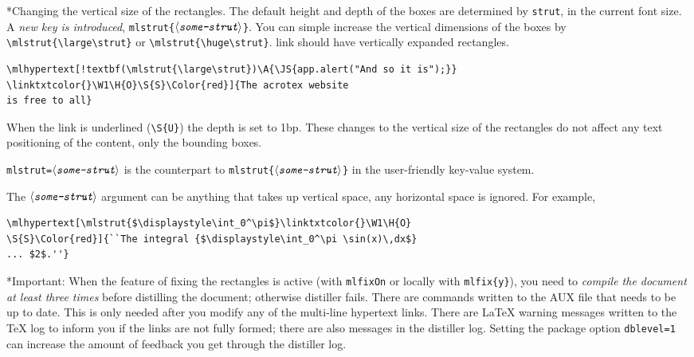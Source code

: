 \documentclass{article}
\makeatletter
\def\amtIndent{15pt}
\def\anglemeta#1{$\langle\textit{\texttt{#1}}\rangle$}
\let\ameta\anglemeta
\def\darg#1{\texttt{\{#1\}}}
\def\cs#1{\texttt{\@backslashchar#1}}
\renewcommand{\paragraph}
    {\@startsection{paragraph}{4}{0pt}{6pt}{-3pt}{\bfseries}}
\makeatother
\begin{document}
\paragraph*{Changing the vertical size of the rectangles.} The default height
and depth of the boxes are determined by \cs{strut}, in the current font
size. A \emph{new key is introduced}, \cs{mlstrut\darg{\ameta{some-strut}}}.
You can simple increase the vertical dimensions of the boxes by
\verb~\mlstrut{\large\strut}~ or \verb~\mlstrut{\huge\strut}~.
 link should have vertically expanded rectangles.
\begin{Verbatim}[xleftmargin=\amtIndent,fontsize=\small,commandchars=!()]
\mlhypertext[!textbf(\mlstrut{\large\strut})\A{\JS{app.alert("And so it is");}}
\linktxtcolor{}\W1\H{O}\S{S}\Color{red}]{The acrotex website
is free to all}
\end{Verbatim}
When the link is underlined (\verb~\S{U}~) the depth is set to 1bp. These
changes to the vertical size of the rectangles do not affect any text
positioning of the content, only the bounding boxes.

\texttt{mlstrut=\ameta{some-strut}} is the counterpart to
 \cs{mlstrut\darg{\ameta{some-strut}}} in the user-friendly key-value system.

The \ameta{some-strut} argument can be anything that takes up vertical space, any horizontal space is ignored.
For example, 
\begin{Verbatim}[xleftmargin=\amtIndent,fontsize=\small,commandchars=!()]
\mlhypertext[\mlstrut{$\displaystyle\int_0^\pi$}\linktxtcolor{}\W1\H{O}
\S{S}\Color{red}]{``The integral {$\displaystyle\int_0^\pi \sin(x)\,dx$}
... $2$.''}
\end{Verbatim}

\paragraph*{Important:} When the feature of fixing the
rectangles is active (with \cs{mlfixOn} or locally with \cs{mlfix\darg{y}}),
you need to \emph{compile the document at least three times} before
distilling the document; otherwise distiller fails. There are commands
written to the \textsf{AUX} file that needs to be up to date. This is only
needed after you modify any of the multi-line hypertext links. There are
{\LaTeX} warning messages written to the {\TeX} log to inform you if the
links are not fully formed; there are also messages in the distiller log.
Setting the package option \texttt{dblevel=1} can increase the amount of
feedback you get through the distiller log.
\end{document}
